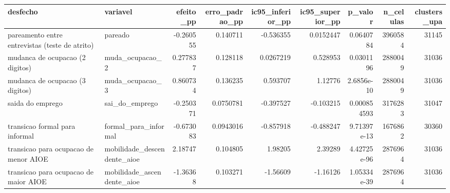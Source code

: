\begin{tabular}{llrrrrrrr}
\toprule
desfecho & variavel & efeito\_pp & erro\_padrao\_pp & ic95\_inferior\_pp & ic95\_superior\_pp & p\_valor & n\_celulas & clusters\_upa \\
\midrule
pareamento entre entrevistas (teste de atrito) & pareado & -0.260555 & 0.140711 & -0.536355 & 0.0152447 & 0.0640784 & 3960584 & 31145 \\
mudanca de ocupacao (2 digitos) & muda\_ocupacao\_2 & 0.277837 & 0.128118 & 0.0267219 & 0.528953 & 0.0301196 & 2880049 & 31036 \\
mudanca de ocupacao (3 digitos) & muda\_ocupacao\_3 & 0.860734 & 0.136235 & 0.593707 & 1.12776 & 2.6856e-10 & 2880049 & 31036 \\
saida do emprego & sai\_do\_emprego & -0.250371 & 0.0750781 & -0.397527 & -0.103215 & 0.000854593 & 3176283 & 31047 \\
transicao formal para informal & formal\_para\_informal & -0.673083 & 0.0943016 & -0.857918 & -0.488247 & 9.71397e-13 & 1676862 & 30360 \\
transicao para ocupacao de menor AIOE & mobilidade\_descendente\_aioe & 2.18747 & 0.104805 & 1.98205 & 2.39289 & 4.42725e-96 & 2876964 & 31036 \\
transicao para ocupacao de maior AIOE & mobilidade\_ascendente\_aioe & -1.36368 & 0.103271 & -1.56609 & -1.16126 & 1.05334e-39 & 2876964 & 31036 \\
\bottomrule
\end{tabular}
